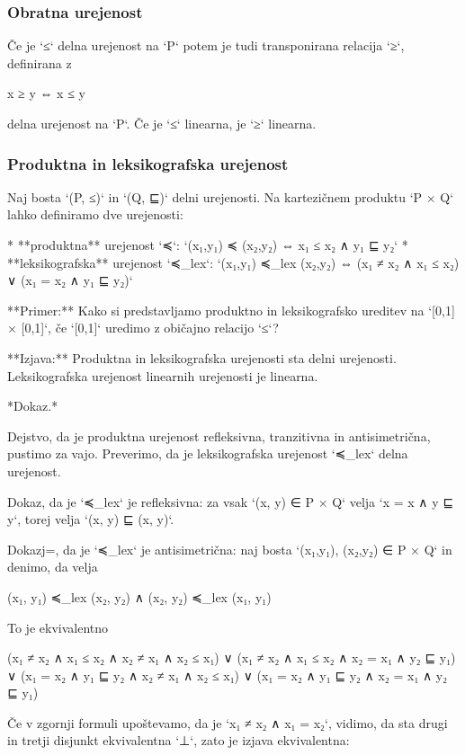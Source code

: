 \subsubsection{Obratna urejenost}

Če je `≤` delna urejenost na `P` potem je tudi transponirana relacija `≥`, definirana z

    x ≥ y ⇔ x ≤ y

delna urejenost na `P`. Če je `≤` linearna, je `≥` linearna.

\subsubsection{Produktna in leksikografska urejenost}

Naj bosta `(P, ≤)` in `(Q, ⊑)` delni urejenosti. Na kartezičnem produktu `P × Q`
lahko definiramo dve urejenosti:

* **produktna** urejenost `≼`: `(x₁,y₁) ≼ (x₂,y₂) ⇔ x₁ ≤ x₂ ∧ y₁ ⊑ y₂`
* **leksikografska** urejenost `≼_lex`: `(x₁,y₁) ≼_lex (x₂,y₂) ⇔ (x₁ ≠ x₂ ∧ x₁ ≤ x₂) ∨ (x₁ = x₂ ∧ y₁ ⊑ y₂)`

**Primer:** Kako si predstavljamo produktno in leksikografsko ureditev na `[0,1] × [0,1]`, če `[0,1]` uredimo z običajno relacijo `≤`?

**Izjava:** Produktna in leksikografska urejenosti sta delni urejenosti. Leksikografska urejenost linearnih urejenosti je linearna.

*Dokaz.*

Dejstvo, da je produktna urejenost refleksivna, tranzitivna in antisimetrična, pustimo za vajo. Preverimo, da je
leksikografska urejenost `≼_lex` delna urejenost.

Dokaz, da je `≼_lex` je refleksivna: za vsak `(x, y) ∈ P × Q` velja `x = x ∧ y ⊑ y`, torej velja `(x, y) ⊑ (x, y)`.

Dokazj=, da je `≼_lex` je antisimetrična: naj bosta `(x₁,y₁), (x₂,y₂) ∈ P × Q` in denimo, da velja

    (x₁, y₁) ≼_lex (x₂, y₂) ∧ (x₂, y₂) ≼_lex (x₁, y₁)

To je ekvivalentno

    (x₁ ≠ x₂ ∧ x₁ ≤ x₂ ∧ x₂ ≠ x₁ ∧ x₂ ≤ x₁) ∨
    (x₁ ≠ x₂ ∧ x₁ ≤ x₂ ∧ x₂ = x₁ ∧ y₂ ⊑ y₁) ∨
    (x₁ = x₂ ∧ y₁ ⊑ y₂ ∧ x₂ ≠ x₁ ∧ x₂ ≤ x₁) ∨
    (x₁ = x₂ ∧ y₁ ⊑ y₂ ∧ x₂ = x₁ ∧ y₂ ⊑ y₁)

Če v zgornji formuli upoštevamo, da je `x₁ ≠ x₂ ∧ x₁ = x₂`, vidimo, da sta drugi in tretji disjunkt ekvivalentna `⊥`, zato
je izjava ekvivalentna:

